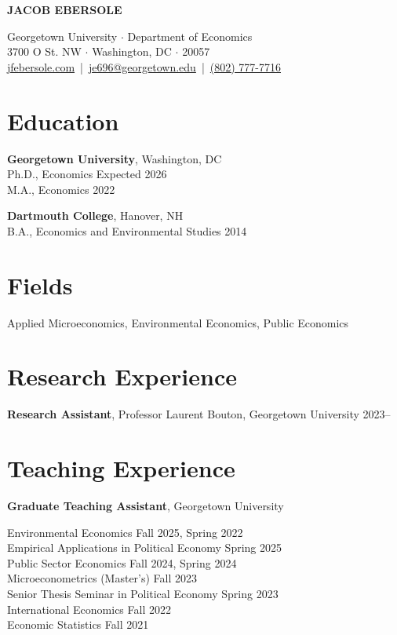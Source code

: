 \documentclass[11pt]{article}
\newcommand{\header}[2]{
    \begin{center}
        {\LARGE \textbf{#1}} \\
        \vspace{10pt}
        #2
    \end{center}
}
\begin{document}
\header{JACOB EBERSOLE}{
  Georgetown University $\cdot$ Department of Economics \\
  3700 O St. NW $\cdot$ Washington, DC $\cdot$ 20057 \\
  \vspace{6pt}
  \href{https://jfebersole.com}{jfebersole.com} \,|\, 
  \href{mailto:je696@georgetown.edu}{je696@georgetown.edu} \,|\, 
  \href{tel:+18027777716}{(802) 777-7716}
}

\section*{Education}

\textbf{Georgetown University}, Washington, DC \\
Ph.D., Economics \hfill Expected 2026 \\
M.A., Economics \hfill 2022

\textbf{Dartmouth College}, Hanover, NH \\
B.A., Economics and Environmental Studies \hfill 2014

\section*{Fields}
Applied Microeconomics, Environmental Economics, Public Economics
\section*{Research Experience}

\textbf{Research Assistant}, Professor Laurent Bouton, Georgetown University \hfill 2023–

\section*{Teaching Experience}

\textbf{Graduate Teaching Assistant}, Georgetown University

Environmental Economics \hfill Fall 2025, Spring 2022 \\
Empirical Applications in Political Economy \hfill Spring 2025 \\
Public Sector Economics \hfill Fall 2024, Spring 2024 \\
Microeconometrics (Master's) \hfill Fall 2023 \\
Senior Thesis Seminar in Political Economy \hfill Spring 2023 \\
International Economics \hfill Fall 2022 \\
Economic Statistics \hfill Fall 2021
\end{document}
